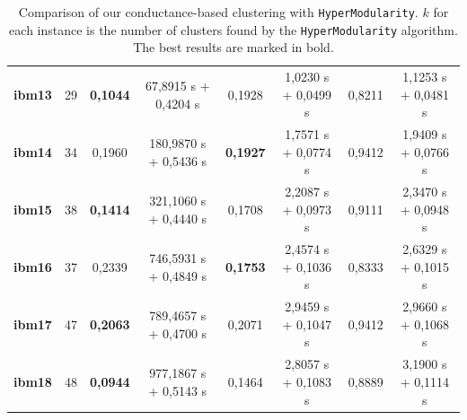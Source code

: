 \documentclass[acmsmall,nonacm,screen,review]{acmart}
\begin{document}
\begin{table}
\begin{tabular}{|c|c|c|c|c|c|c|c|}
\textbf{ibm13} & 29         & \textbf{0,1044} & 67,8915 s + 0,4204 s  & 0,1928 & 1,0230 s + 0,0499 s & 0,8211 & 1,1253 s + 0,0481 s  \\ 
\textbf{ibm14} & 34         & 0,1960 & 180,9870 s + 0,5436 s & \textbf{0,1927} & 1,7571 s + 0,0774 s & 0,9412 & 1,9409 s + 0,0766 s  \\ 
\textbf{ibm15} & 38         & \textbf{0,1414} & 321,1060 s + 0,4440 s & 0,1708 & 2,2087 s + 0,0973 s & 0,9111 & 2,3470 s + 0,0948 s  \\ 
\textbf{ibm16} & 37         & 0,2339 & 746,5931 s + 0,4849 s & \textbf{0,1753} & 2,4574 s + 0,1036 s & 0,8333 & 2,6329 s + 0,1015 s  \\ 
\textbf{ibm17} & 47         & \textbf{0,2063} & 789,4657 s + 0,4700 s & 0,2071 & 2,9459 s + 0,1047 s & 0,9412 & 2,9660 s + 0,1068 s  \\ 
\textbf{ibm18} & 48         & \textbf{0,0944} & 977,1867 s + 0,5143 s & 0,1464 & 2,8057 s + 0,1083 s & 0,8889 & 3,1900 s + 0,1114 s  \\ \hline
    \end{tabular}
    \caption{Comparison of our conductance-based clustering with \texttt{HyperModularity}. 
    $k$ for each instance is the number of clusters found by the \texttt{HyperModularity} 
    algorithm. The best results are marked in bold.}
    \label{tab:comparison}
\end{table}
\end{document}
